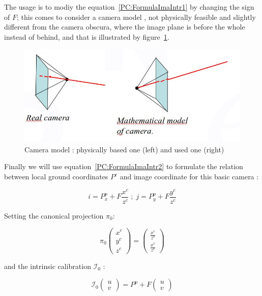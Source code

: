 The usage is to modiy the equation~\ref{PC:FormulaImaIntr1} by changing the sign of $F$;
this comes to consider a camera model ,
 not physically feasible and slightly different from the camera obscura,  
where the image plane is before the whole instead of behind, and that
is illustrated by figure~\ref{fig:PcInvCam}.  

\begin{figure}
\centering
\includegraphics[width=12cm]{Methods/Images/InvCamera.jpg}
	\caption{Camera model : physically based one (left) and used one (right)}
	\label{fig:PcInvCam}
\end{figure}

Finally we will use equation~\ref{PC:FormulaImaIntr2} to formulate the relation between
local ground coordinates $P^c$  and image coordinate for this basic camera :

\begin{equation}
	i = P^p_x +F \frac{x^c}{z^c}  \; ; \;
	j = P^p_y +F \frac{y^c}{z^c}  
	\label{PC:FormulaImaIntr2}
\end{equation}

Setting the canonical projection $\pi_0$:

\begin{equation}
	  \pi_0 \begin{pmatrix} x^c \\ y^c \\ z^c \end{pmatrix} 
           =  \begin{pmatrix} \frac{x^c}{z^c} \\  \frac{x^c}{z^c}  \end{pmatrix} 
\end{equation}

and the intrinsic calibration $ \mathcal{I}_0$ :

\begin{equation}
	   \mathcal{I}_0  \begin{pmatrix} u \\  v  \end{pmatrix} 
		   =  P^p + F  \begin{pmatrix} u \\  v  \end{pmatrix}  \label{EqIntNoDist}
\end{equation}

